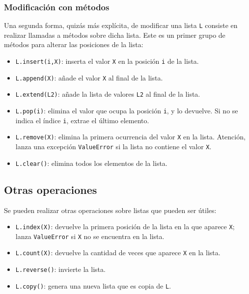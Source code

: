 \subsubsection{Modificación con métodos}

Una segunda forma, quizás más explícita, de modificar una lista \texttt{L} consiste en realizar llamadas a métodos sobre dicha lista. Este es un primer grupo de métodos para alterar las posiciones de la lista:

\begin{itemize}
	\item \texttt{L.insert(i,X)}: inserta el valor \texttt{X} en la posición \texttt{i} de la lista.
	\item \texttt{L.append(X)}: añade el valor \texttt{X} al final de la lista.
	\item \texttt{L.extend(L2)}: añade la lista de valores \texttt{L2} al final de la lista.
	\item \texttt{L.pop(i)}: elimina el valor que ocupa la posición \texttt{i}, y lo devuelve. Si no se indica el índice \texttt{i}, extrae el último elemento.
	\item \texttt{L.remove(X)}: elimina la primera ocurrencia del valor \texttt{X} en la lista. Atención, lanza una excepción \texttt{ValueError} si la lista no contiene el valor \texttt{X}.
	\item \texttt{L.clear()}: elimina todos los elementos de la lista.
\end{itemize}

\subsection{Otras operaciones}

Se pueden realizar otras operaciones sobre listas que pueden ser útiles:

\begin{itemize}
	\item \texttt{L.index(X)}: devuelve la primera posición de la lista en la que aparece \texttt{X}; lanza \texttt{ValueError} si \texttt{X} no se encuentra en la lista.
	\item \texttt{L.count(X)}: devuelve la cantidad de veces que aparece \texttt{X} en la lista.
	\item \texttt{L.reverse()}: invierte la lista.
	\item \texttt{L.copy()}: genera una nueva lista que es copia de \texttt{L}.
\end{itemize}

